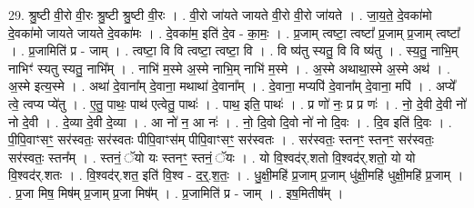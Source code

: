 \documentclass[17pt]{extarticle}
\begin{document}
29. श्रु॒ष्टी वी॒रो वी॒रः श्रु॒ष्टी श्रु॒ष्टी वी॒रः । . वी॒रो जा॑यते जायते वी॒रो वी॒रो जा॑यते । . जा॒य॒ते॒ दे॒वका॑मो दे॒वका॑मो जायते जायते दे॒वका॑मः । . दे॒वका॑म॒ इति॑ दे॒व - का॒मः॒ । . प्र॒जाम् त्वष्टा॒ त्वष्टा᳚ प्र॒जाम् प्र॒जाम् त्वष्टा᳚ । . प्र॒जामिति॑ प्र - जाम् । . त्वष्टा॒ वि वि त्वष्टा॒ त्वष्टा॒ वि । . वि ष्य॑तु स्यतु॒ वि वि ष्य॑तु । . स्य॒तु॒ नाभि॒म् नाभिꣳ॑ स्यतु स्यतु॒ नाभि᳚म् । . नाभि॑ म॒स्मे अ॒स्मे नाभि॒म् नाभि॑ म॒स्मे । . अ॒स्मे अथाथा॒स्मे अ॒स्मे अथ॑ । . अ॒स्मे इत्य॒स्मे । . अथा॑ दे॒वाना᳚म् दे॒वाना॒ मथाथा॑ दे॒वाना᳚म् । . दे॒वाना॒ मप्यपि॑ दे॒वाना᳚म् दे॒वाना॒ मपि॑ । . अप्ये᳚ त्वे॒ त्वप्य प्ये॑तु । . ए॒तु॒ पाथः॒ पाथ॑ एत्वेतु॒ पाथः॑ । . पाथ॒ इति॒ पाथः॑ । . प्र णो॑ नः॒ प्र प्र णः॑ । . नो॒ दे॒वी दे॒वी नो॑ नो दे॒वी । . दे॒व्या दे॒वी दे॒व्या । . आ नो॑ न॒ आ नः॑ । . नो॒ दि॒वो दि॒वो नो॑ नो दि॒वः । . दि॒व इति॑ दि॒वः । . पी॒पि॒वाꣳसꣳ॒॒ सर॑स्वतः॒ सर॑स्वतः पीपि॒वाꣳस॑म् पीपि॒वाꣳसꣳ॒॒ सर॑स्वतः । . सर॑स्वतः॒ स्तनꣳ॒॒ स्तनꣳ॒॒ सर॑स्वतः॒ सर॑स्वतः॒ स्तन᳚म् । . स्तनं॒ ॅयो यः स्तनꣳ॒॒ स्तनं॒ ॅयः । . यो वि॒श्वद॑र्.शतो वि॒श्वद॑र्.शतो॒ यो यो वि॒श्वद॑र्.शतः । . वि॒श्वद॑र्.शत॒ इति॑ वि॒श्व - द॒र्॒.श॒तः॒ । . धु॒क्षी॒महि॑ प्र॒जाम् प्र॒जाम् धु॑क्षी॒महि॑ धुक्षी॒महि॑ प्र॒जाम् । . प्र॒जा मिष॒ मिष॑म् प्र॒जाम् प्र॒जा मिष᳚म् । . प्र॒जामिति॑ प्र - जाम् । . इष॒मितीष᳚म् । \newline
\end{document}
